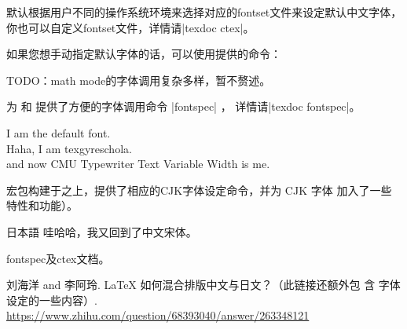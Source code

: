 默认根据用户不同的操作系统环境来选择对应的fontset文件来设定默认中文字体，
你也可以自定义fontset文件，详情请|texdoc ctex|。

如果您想手动指定默认字体的话，可以使用提供的命令：
\begin{texlist}
\end{texlist}

TODO：math mode的字体调用复杂多样，暂不赘述。



为 \XeLaTeX{} 和 \LuaLaTeX{} 提供了方便的字体调用命令 |fontspec| ，
详情请|texdoc fontspec|。
\begin{texlist}
  \newfontfamily{}

  I am the default font. \\
   Haha, I am texgyreschola. \\
  \fontCMUtv and now CMU Typewriter Text Variable Width is me.
\end{texlist}

宏包构建于之上，提供了相应的CJK字体设定命令，并为 CJK 字体
加入了一些特性和功能）。
\begin{texlist}


  \newCJKfontfamily{} %
  \gothic 日本語
  \songti 哇哈哈，我又回到了中文宋体。
\end{texlist}

\begin{reference}
  \item fontspec及ctex文档。
  \item 刘海洋 and 李阿玲. \LaTeX{} 如何混合排版中文与日文？（此链接还额外包
    含\pTeX{} 字体设定的一些内容）.
    \url{https://www.zhihu.com/question/68393040/answer/263348121}
\end{reference}


